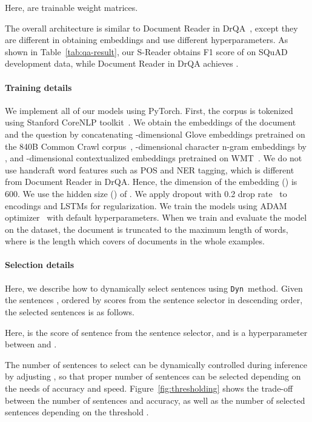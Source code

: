 \documentclass[11pt,a4paper]{article}
\newcommand{\dyn}{{\tt Dyn}}
\begin{document}
\vspace{-.5cm}



Here,  are trainable weight matrices.

The overall architecture is similar to Document Reader in DrQA~\cite{squad-open}, except they are different in obtaining embeddings and use different hyperparameters.
As shown in Table~\ref{tab:qa-result}, our S-Reader obtains F1 score of  on SQuAD development data, while Document Reader in DrQA achieves .

\paragraph{Training details}
We implement all of our models using PyTorch. First, the corpus is tokenized using Stanford CoreNLP toolkit~\citep{corenlp}. We obtain the embeddings of the document and the question by concatenating -dimensional Glove embeddings pretrained on the 840B Common Crawl corpus~\citep{glove}, -dimensional character n-gram embeddings by \citet{charembedding}, and -dimensional contextualized embeddings pretrained on WMT~\citep{cove}.
We do not use handcraft word features such as POS and NER tagging, which is different from Document Reader in DrQA.
Hence, the dimension of the embedding () is 600. We use the hidden size () of .
We apply dropout with 0.2 drop rate~\cite{srivastava2014dropout} to encodings and LSTMs for regularization.
We train the models using ADAM optimizer~\citep{adam} with default hyperparameters.
When we train and evaluate the model on the dataset, the document is truncated to the maximum length of  words, where    is the length which covers  of documents in the whole examples.

\paragraph{Selection details}
Here, we describe how to dynamically select sentences using \dyn~method. Given the sentences , ordered by scores from the sentence selector in descending order, the selected sentences  is as follows.

\vspace{-.5cm}


Here,  is the score of sentence  from the sentence selector, and  is a hyperparameter between  and .

The number of sentences to select can be dynamically controlled during inference by adjusting , so that proper number of sentences can be selected depending on the needs of accuracy and speed.
Figure~\ref{fig:thresholding} shows the trade-off between the number of sentences and accuracy, as well as the number of selected sentences depending on the threshold .
\end{document}
